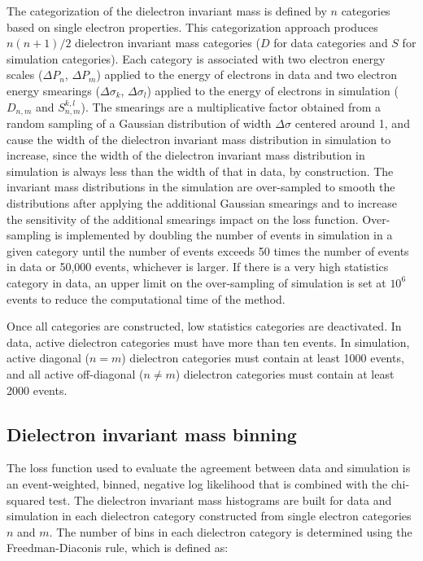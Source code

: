 The categorization of the dielectron invariant mass is defined by $n$ categories based on single electron properties. This categorization approach produces $n(n+1)/2$ dielectron invariant mass categories ($D$ for data categories and $S$ for simulation categories). Each category is associated with two electron energy scales ($\Delta P_n$, $\Delta P_m$) applied to the energy of electrons in data and two electron energy smearings ($\Delta \sigma_k$, $\Delta \sigma_l$) applied to the energy of electrons in simulation ($D_{n,m}$ and $S^{k,l}_{n,m}$).\footnotemark{} The smearings are a multiplicative factor obtained from a random sampling of a Gaussian distribution of width $\Delta \sigma$ centered around 1, and cause the width of the dielectron invariant mass distribution in simulation to increase, since the width of the dielectron invariant mass distribution in simulation is always less than the width of that in data, by construction. The invariant mass distributions in the simulation are over-sampled to smooth the distributions after applying the additional Gaussian smearings and to increase the sensitivity of the additional smearings impact on the loss function. Over-sampling is implemented by doubling the number of events in simulation in a given category until the number of events exceeds 50 times the number of events in data or 50,000 events, whichever is larger. If there is a very high statistics category in data, an upper limit on the over-sampling of simulation is set at $10^6$ events to reduce the computational time of the method.

Once all categories are constructed, low statistics categories are deactivated. In data, active dielectron categories must have more than ten events. In simulation, active diagonal ($n = m$) dielectron categories must contain at least 1000 events, and all active off-diagonal ($n \neq m$) dielectron categories must contain at least 2000 events.

\subsection{Dielectron invariant mass binning}
    
The loss function used to evaluate the agreement between data and simulation is an event-weighted, binned, negative log likelihood that is combined with the chi-squared test. The dielectron invariant mass histograms are built for data and simulation in each dielectron category constructed from single electron categories $n$ and $m$. The number of bins in each dielectron category is determined using the Freedman-Diaconis rule, which is defined as:
 
